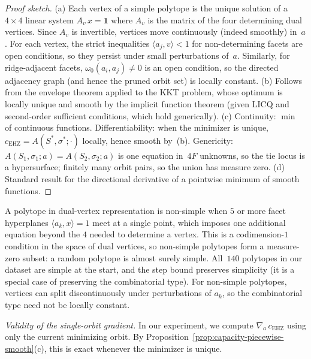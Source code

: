 \begin{unverified}
\begin{proof}[Proof sketch]
(a) Each vertex of a simple polytope is the unique solution of a $4 \times 4$
linear system $A_v\,x = \mathbf{1}$ where $A_v$ is the matrix of the four
determining dual vertices. Since $A_v$ is invertible, vertices move
continuously (indeed smoothly) in~$a$.
For each vertex, the strict inequalities
$\langle a_j, v \rangle < 1$ for non-determining facets are open conditions, so they
persist under small perturbations of~$a$.
Similarly, for ridge-adjacent facets, $\omega_0(a_i, a_j) \neq 0$ is an open
condition, so the directed adjacency graph (and hence the pruned orbit set)
is locally constant.
(b) Follows from the envelope theorem applied to the KKT problem, whose
optimum is locally unique and smooth by the implicit function theorem
(given LICQ and second-order sufficient conditions, which hold generically).
(c) Continuity: $\min$ of continuous functions.
Differentiability: when the minimizer is unique, $c_{\mathrm{EHZ}} =
A(S^*,\sigma^*;\cdot)$ locally, hence smooth by~(b).
Genericity: $A(S_1,\sigma_1;a) = A(S_2,\sigma_2;a)$ is one equation in~$4F$
unknowns, so the tie locus is a hypersurface; finitely many orbit pairs, so
the union has measure zero.
(d) Standard result for the directional derivative of a pointwise minimum
of smooth functions.
\end{proof}
\end{unverified}

\begin{remark}
\label{rem:simplicity-generic}
A polytope in dual-vertex representation is non-simple when $5$ or more facet
hyperplanes $\langle a_k, x \rangle = 1$ meet at a single point, which
imposes one additional equation beyond the $4$ needed to determine a vertex.
This is a codimension-$1$ condition in the space of dual vertices, so non-simple
polytopes form a measure-zero subset: a random polytope is almost surely simple.
All~$140$ polytopes in our dataset are simple at the start, and the step bound
preserves simplicity (it is a special case of preserving the combinatorial type).
For non-simple polytopes, vertices can split discontinuously under
perturbations of $a_k$, so the combinatorial type need not be locally constant.
\end{remark}

\emph{Validity of the single-orbit gradient.}
In our experiment, we compute $\nabla_a\,c_{\mathrm{EHZ}}$ using only
the current minimizing orbit. By Proposition~\ref{prop:capacity-piecewise-smooth}(c),
this is exact whenever the minimizer is unique.

